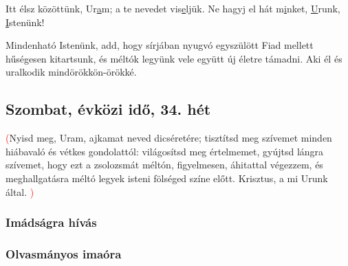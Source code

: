\documentclass[twoside]{article}
\begin{document}
Itt élsz közöttünk, Ur\underline{a}m; a te nevedet vis\underline{e}ljük. Ne hagyj el hát m\underline{i}nket, \underline{U}runk, \underline{I}stenünk!



Mindenható Istenünk, add, hogy sírjában nyugvó egyszülött Fiad mellett hűségesen kitartsunk, és méltók legyünk vele együtt új életre támadni. Aki él és uralkodik mindörökkön-örökké.



\subsection*{Szombat, évközi idő, 34. hét}

\textcolor{red}{(}Nyisd meg, Uram, ajkamat neved dicséretére; tisztítsd meg szívemet minden
hiába\-való és vétkes gondolattól: világosítsd meg értelmemet, gyújtsd lángra szívemet, hogy ezt a zsolozsmát méltón, figyelmesen, áhitattal végezzem, és meghallgatásra méltó legyek isteni fölséged színe előtt. Krisztus, a mi Urunk által. \textcolor{red}{)}

\subsubsection*{Imádságra hívás}


\begin{gregosheet}
\end{gregosheet}

\subsubsection*{Olvasmányos imaóra}

\end{document}
